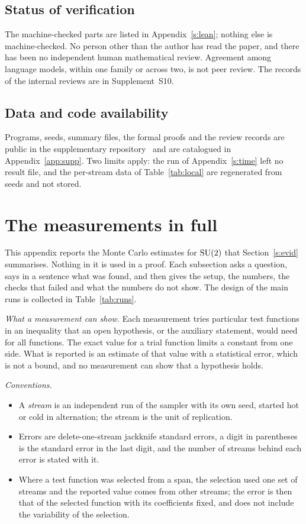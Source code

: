 \subsection*{Status of verification}
The machine-checked parts are listed in Appendix~\ref{s:lean}; nothing else is machine-checked. No person
other than the author has read the paper, and there has been no independent human mathematical review.
Agreement among language models, within one family or across two, is not peer review. The records of the
internal reviews are in Supplement~S10.

\subsection*{Data and code availability}
Programs, seeds, summary files, the formal proofs and the review records are public in the supplementary
repository~\cite{Supp} and are catalogued in Appendix~\ref{app:supp}. Two limits apply: the run of
Appendix~\ref{s:time} left no result file, and the per-stream data of Table~\ref{tab:local} are regenerated
from seeds and not stored.

\appendix
\section{The measurements in full}\label{app:meas}
This appendix reports the Monte Carlo estimates for $\mathrm{SU}(2)$ that Section~\ref{s:evid} summarises. Nothing in it is used in a proof. Each subsection
asks a question, says in a sentence what was found, and then gives the setup, the numbers, the checks that
failed and what the numbers do not show. The design of the main runs is collected in Table~\ref{tab:runs}.

\emph{What a measurement can show.} Each measurement tries particular test functions in an inequality that an
open hypothesis, or the auxiliary statement, would need for all functions. The exact value for a trial
function limits a constant from one side. What is reported is an estimate of that value with a statistical
error, which is not a bound, and no measurement can show that a hypothesis holds.

\emph{Conventions.}
\begin{itemize}
\item A \emph{stream} is an independent run of the sampler with its own seed, started hot or cold in
alternation; the stream is the unit of replication.
\item Errors are delete-one-stream jackknife standard errors, a digit in parentheses is the standard error in
the last digit, and the number of streams behind each error is stated with it.
\item Where a test function was selected from a span, the selection used one set of streams and the reported
value comes from other streams; the error is then that of the selected function with its coefficients fixed,
and does not include the variability of the selection.
\end{itemize}

